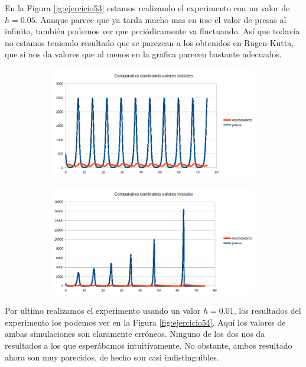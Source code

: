 \documentclass[12pt,a4paper]{article}
\begin{document}
En la Figura \ref{ig:ejercicio53} estamos realizando el experimento con un valor de $h=0.05$. Aunque parece que ya tarda mucho mas en irse el valor de presas al infinito, también podemos ver que periódicamente va fluctuando. Así que todavía no estamos teniendo resultado que se parezcan a los obtenidos en Rugen-Kutta, que si nos da valores que al menos en la grafica parecen bastante adecuados. 
\begin{figure}[H]
	\centering
	\begin{subfigure}{.5\textwidth}
		\centering
	\includegraphics[width=1\linewidth]{images/ejercicio5_3_1}
		\caption{}
	\label{fig:ejercicio531}
	\end{subfigure}%
	\begin{subfigure}{.5\textwidth}
		\centering
	\includegraphics[width=1\linewidth]{images/ejercicio5_3_2}
		\caption{}
	\label{fig:ejercicio532}
	\end{subfigure}
	
	\label{fig:ejercicio53}
\end{figure}
Por ultimo realizamos el experimento usando un valor $h=0.01$, los resultados del experimento los podemos ver en la Figura \ref{fig:ejercicio54}. Aquí los valores de ambas simulaciones son claramente erróneos. Ninguno de los dos nos da resultados a los que esperábamos intuitivamente. No obstante, ambos resultado ahora son muy parecidos, de hecho son casi indistinguibles. 
\end{document}
